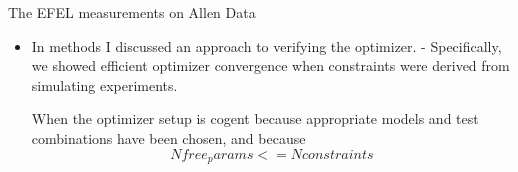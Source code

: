 The EFEL measurements on Allen Data








\begin{itemize}

\item  In methods I discussed an approach to verifying the optimizer.
- Specifically, we showed efficient optimizer convergence when constraints were derived from simulating experiments.

When the optimizer setup is cogent because appropriate models and test combinations have been chosen, and because 
\begin{equation}

N free_params <= N constraints
\end{equation}


\end{itemize}

